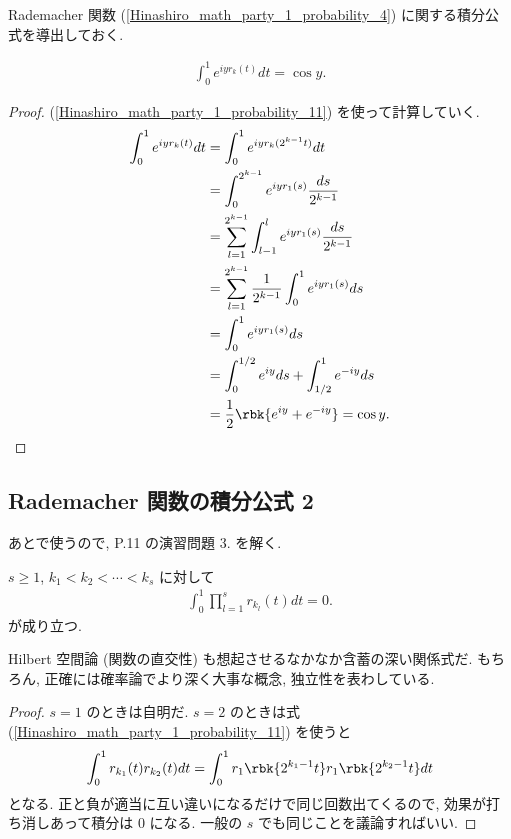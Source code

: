 \documentclass[openany, a4paper, oneside]{jsbook}
\begin{document}
Rademacher 関数 (\ref{Hinashiro_math_party_1_probability_4}) に関する積分公式を導出しておく.
\begin{thm}
 \begin{align}
  \int_0^1 e^{iy r_k (t)} dt
  =
  \cos y.
 \end{align}
\end{thm}
\begin{proof}
(\ref{Hinashiro_math_party_1_probability_11}) を使って計算していく.
\begin{align}
 \int_0^1 e^{i y r_k (t)} dt
 &=
 \int_{0}^{1} e^{i y r_k (2^{k-1}t)} dt \\
 &=
 \int_{0}^{2^{k-1}} e^{i y r_1 (s)} \frac{ds}{2^{k-1}} \\
 &=
 \sum_{l=1}^{2^{k-1}} \int_{l-1}^{l} e^{i y r_1 (s)} \frac{ds}{2^{k-1}} \\
 &=
 \sum_{l=1}^{2^{k-1}} \frac{1}{2^{k-1}} \int_{0}^{1} e^{i y r_1 (s)} ds \\
 &=
 \int_{0}^{1} e^{i y r_1 (s)} ds \\
 &=
 \int_{0}^{1/2} e^{iy} ds + \int_{1/2}^{1} e^{-iy} ds \\
 &=
 \frac{1}{2} \rbk{e^{iy} + e^{-iy}}
 =
 \cos y.
\end{align}
\end{proof}
\subsection{Rademacher 関数の積分公式 2 \label{Hinashiro_math_party_1_probability_10}}

あとで使うので, \cite{MarkKac1} P.11 の演習問題 3. を解く.
\begin{prop}
 $s \geq 1$, $k_1 < k_2 < \cdots < k_s$ に対して
 \begin{align}
  \int_0^1 \prod_{l=1}^s r_{k_l} (t) dt = 0.
 \end{align}
 が成り立つ.
\end{prop}
Hilbert 空間論 (関数の直交性) も想起させるなかなか含蓄の深い関係式だ.
もちろん, 正確には確率論でより深く大事な概念, 独立性を表わしている.
\begin{proof}
$s = 1$ のときは自明だ.
$s = 2$ のときは式 (\ref{Hinashiro_math_party_1_probability_11}) を使うと
\begin{align}
 \int_0^1 r_{k_1} (t) r_{k_2} (t) dt
 =
 \int_0^1 r_1 \rbk{2^{k_1 - 1}t} r_1 \rbk{2^{k_2 - 1} t} dt
\end{align}
となる.
正と負が適当に互い違いになるだけで同じ回数出てくるので, 効果が打ち消しあって積分は 0 になる.
一般の $s$ でも同じことを議論すればいい.
\end{proof}
\end{document}
